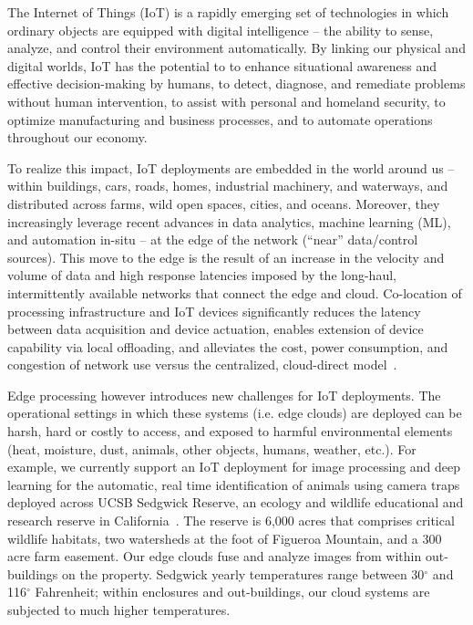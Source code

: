 The Internet of Things (IoT) is a rapidly emerging set of technologies in which ordinary objects are equipped with digital intelligence -- the ability to sense, analyze, and control their environment automatically. By linking our physical and digital worlds, IoT has the potential to to enhance situational awareness and effective decision-making by humans, to detect, diagnose, and remediate problems without human intervention, to assist with personal and homeland security, to optimize manufacturing and business processes, and to automate operations throughout our economy.

To realize this impact, IoT deployments are embedded in the world around us -- within buildings, cars, roads, homes, industrial machinery, and waterways, and distributed across farms, wild open spaces, cities, and oceans. Moreover, they increasingly leverage recent advances in data analytics, machine learning (ML), and automation in-situ -- at the edge of the network (``near'' data/control sources). This move to the edge is the result of an increase in the velocity and volume of data and high response latencies imposed by the long-haul, intermittently available networks that connect the edge and cloud. Co-location of processing infrastructure and IoT devices significantly reduces the latency between data acquisition and device actuation, enables extension of device capability via local offloading, and alleviates the cost, power consumption, and congestion of network use versus the centralized, cloud-direct model~\cite{edge,bonomi2012fog,cloudlets,cloudlets2012satya,verbelen2012cloudlets}.

Edge processing however introduces new challenges for IoT deployments. The operational settings in which these systems (i.e. edge clouds) are deployed can be harsh, hard or costly to access, and exposed to harmful environmental elements (heat, moisture, dust, animals, other objects, humans, weather, etc.). For example, we currently support an IoT deployment for image processing and deep learning for the automatic, real time identification of animals using camera traps deployed across UCSB Sedgwick Reserve, an ecology and wildlife educational and research reserve in California~\cite{ref:sedgwick}. The reserve is 6,000 acres that comprises critical wildlife habitats, two watersheds at the foot of Figueroa Mountain, and a 300 acre farm easement. Our edge clouds fuse and analyze images from within out-buildings on the property. Sedgwick yearly temperatures range between 30$^{\circ}$ and 116$^{\circ}$ Fahrenheit; within enclosures and out-buildings, our cloud systems are subjected to much higher temperatures.

